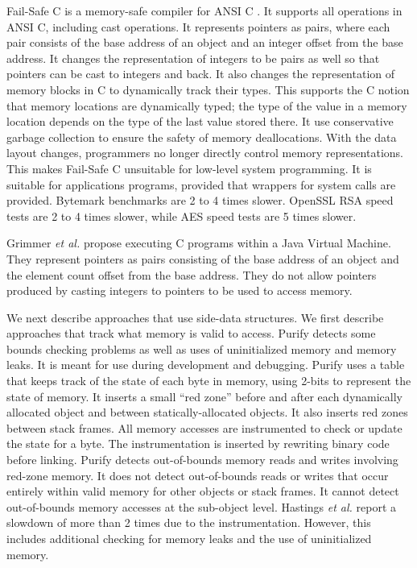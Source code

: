 Fail-Safe C is a memory-safe compiler for ANSI C \cite{Oiwa2009}.  It
supports all operations in ANSI C, including cast operations.
It represents pointers as pairs, where each pair consists of the base address
of an object and an integer offset from the base address. 
It changes the representation of integers to be pairs as well so that pointers can 
be cast to integers and back.  It also changes the representation of memory blocks in
C to dynamically track their types.  This
supports the C notion that memory locations are dynamically typed; the type
of the value in a memory location depends on the type of the last value stored there.
It use conservative garbage collection to ensure the safety of memory
deallocations.   With the data layout changes, programmers no longer 
directly control memory representations.  This makes Fail-Safe C unsuitable for low-level  system programming.
It is suitable for applications programs, provided that wrappers for system
calls are provided.  Bytemark benchmarks are 2 to 4 times slower.  OpenSSL RSA
speed tests are 2 to 4 times slower, while AES speed tests are 5 times slower.

Grimmer {\it et al.} \cite{Grimmer2015} propose executing C programs within a Java
Virtual Machine.   They represent pointers as pairs consisting of the base address 
of an object and the element count offset from the base address.  They do not allow
pointers produced by casting integers to pointers to be used to access
memory.

We next describe approaches that use side-data structures.    We first
describe approaches that track what memory is valid to access.
Purify \cite{Hastings1992, Unicom2016} detects some bounds checking problems
as well as uses of uninitialized memory and memory leaks.  It is meant for
use during development and debugging.  Purify uses a table that keeps track
of the state of each byte in memory, using 2-bits to represent the state of
memory.  It inserts a small ``red zone'' before and after each dynamically
allocated object and between statically-allocated objects.   It also
inserts red zones between stack frames.  All memory accesses are instrumented 
to  check or update the state for a byte. 
The instrumentation is inserted by rewriting binary code before linking.
Purify detects out-of-bounds memory reads and writes involving red-zone
memory.   It does not detect out-of-bounds
reads or writes that occur entirely within valid memory for other objects
or stack frames. It cannot detect out-of-bounds memory accesses at
the sub-object level.
Hastings {\it et al.} report a slowdown of more than 2 times due to
the instrumentation.  However, this includes additional checking for memory leaks 
and the use of uninitialized memory.

